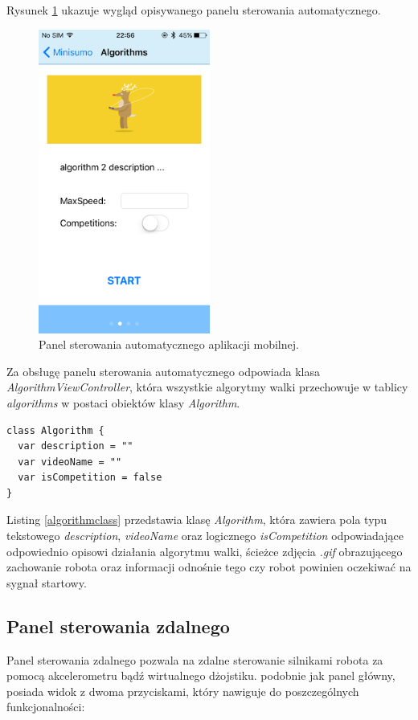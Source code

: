 Rysunek \ref{fig:automaticview} ukazuje wygląd opisywanego panelu sterowania automatycznego. 

\begin{figure}[H]
	\centering
		\includegraphics[width=0.75\linewidth, height=10cm, keepaspectratio, fbox]{pic05/algorithm.PNG}
	\caption{Panel sterowania automatycznego aplikacji mobilnej.}
	\label{fig:automaticview}	
\end{figure}

Za obsługę panelu sterowania automatycznego  odpowiada klasa 	\textit{AlgorithmViewController}, która wszystkie algorytmy walki przechowuje w tablicy \textit{algorithms} w postaci obiektów klasy \textit{Algorithm}.
  
\begin{minipage}{\textwidth}
	\begin{lstlisting}[label=algorithmclass,caption=Klasa Algorithm.]
class Algorithm {
  var description = ""
  var videoName = ""
  var isCompetition = false
}
	\end{lstlisting}
\end{minipage}

Listing \ref{algorithmclass} przedstawia klasę \textit{Algorithm}, która zawiera pola typu tekstowego \textit{description}, \textit{videoName} oraz logicznego \textit{isCompetition} odpowiadające odpowiednio opisowi działania algorytmu walki, ścieżce zdjęcia \textit{.gif} obrazującego zachowanie robota oraz informacji odnośnie tego czy robot powinien oczekiwać na sygnał startowy.
 
\subsection{Panel sterowania zdalnego}
Panel sterowania zdalnego pozwala na zdalne sterowanie silnikami robota za pomocą akcelerometru bądź wirtualnego dżojstiku. podobnie jak panel główny, posiada  widok z dwoma przyciskami, który nawiguje do poszczególnych funkcjonalności:
 
